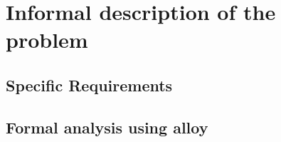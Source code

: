 \documentclass{report}
\begin{document}

\normalfont
\newpage

\part{Informal description of the problem}





\chapter{Specific Requirements}

\chapter{Formal analysis using alloy}


\end{document}
